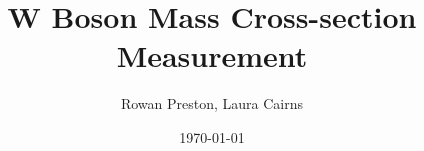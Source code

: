 \documentclass[a4paper]{article}
\title{W Boson Mass Cross-section Measurement}
\author{Rowan Preston, Laura Cairns}
\date{\today}
\begin{document}
\maketitle

\BsToJPsiPhi \cite{TestCitation}

{}

\end{document}
